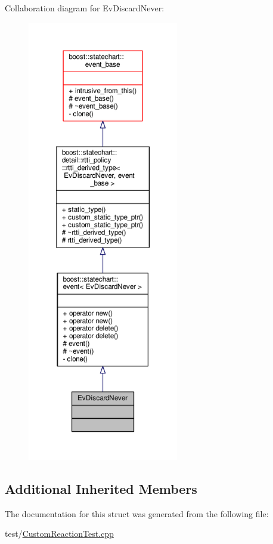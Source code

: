 Collaboration diagram for Ev\+Discard\+Never\+:
\nopagebreak
\begin{figure}[H]
\begin{center}
\leavevmode
\includegraphics[height=550pt]{struct_ev_discard_never__coll__graph}
\end{center}
\end{figure}
\subsection*{Additional Inherited Members}


The documentation for this struct was generated from the following file\+:\begin{DoxyCompactItemize}
\item 
test/\mbox{\hyperlink{_custom_reaction_test_8cpp}{Custom\+Reaction\+Test.\+cpp}}\end{DoxyCompactItemize}
